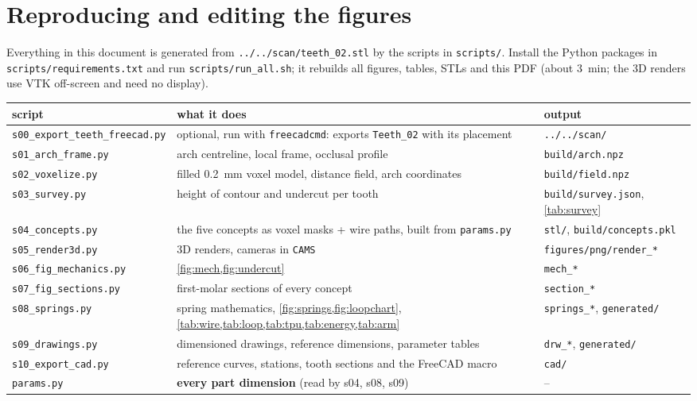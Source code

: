 
\section{Reproducing and editing the figures}\label{sec:reproduce}
Everything in this document is generated from \texttt{../../scan/teeth\_02.stl} by the scripts in
\texttt{scripts/}. Install the Python packages in \texttt{scripts/requirements.txt} and run
\texttt{scripts/run\_all.sh}; it rebuilds all figures, tables, STLs and this PDF (about
\SI{3}{min}; the 3D renders use VTK off-screen and need no display).

\begin{table}[H]\centering\small
\begin{tabularx}{\textwidth}{l X l}
\toprule
script & what it does & output\\
\midrule
\texttt{s00\_export\_teeth\_freecad.py} & optional, run with \texttt{freecadcmd}: exports \texttt{Teeth\_02} with its placement & \texttt{../../scan/}\\
\texttt{s01\_arch\_frame.py} & arch centreline, local frame, occlusal profile & \texttt{build/arch.npz}\\
\texttt{s02\_voxelize.py} & filled \SI{0.2}{mm} voxel model, distance field, arch coordinates & \texttt{build/field.npz}\\
\texttt{s03\_survey.py} & height of contour and undercut per tooth & \texttt{build/survey.json}, \cref{tab:survey}\\
\texttt{s04\_concepts.py} & the five concepts as voxel masks + wire paths, built from \texttt{params.py} & \texttt{stl/}, \texttt{build/concepts.pkl}\\
\texttt{s05\_render3d.py} & 3D renders, cameras in \texttt{CAMS} & \texttt{figures/png/render\_*}\\
\texttt{s06\_fig\_mechanics.py} & \cref{fig:mech,fig:undercut} & \texttt{mech\_*}\\
\texttt{s07\_fig\_sections.py} & first-molar sections of every concept & \texttt{section\_*}\\
\texttt{s08\_springs.py} & spring mathematics, \cref{fig:springs,fig:loopchart}, \cref{tab:wire,tab:loop,tab:tpu,tab:energy,tab:arm} & \texttt{springs\_*}, \texttt{generated/}\\
\texttt{s09\_drawings.py} & dimensioned drawings, reference dimensions, parameter tables & \texttt{drw\_*}, \texttt{generated/}\\
\texttt{s10\_export\_cad.py} & reference curves, stations, tooth sections and the FreeCAD macro & \texttt{cad/}\\
\texttt{params.py} & \textbf{every part dimension} (read by s04, s08, s09) & --\\
\bottomrule
\end{tabularx}
\end{table}


